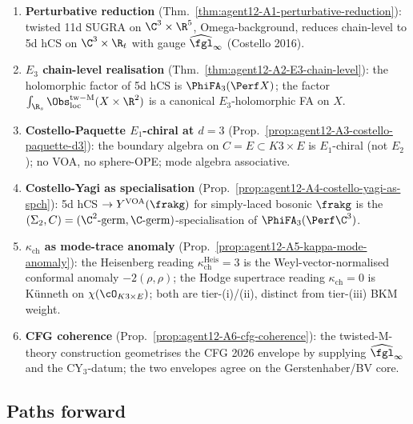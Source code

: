 \begin{enumerate}
\item \textbf{Perturbative reduction} (Thm.~\ref{thm:agent12-A1-perturbative-reduction}):
twisted 11d SUGRA on $\C^3 \times \R^5$, Omega-background, reduces
chain-level to 5d hCS on $\C^3 \times \R_t$ with gauge
$\widehat{\fgl}_\infty$ (Costello 2016).
\item \textbf{$E_3$ chain-level realisation} (Thm.~\ref{thm:agent12-A2-E3-chain-level}):
the holomorphic factor of 5d hCS is $\PhiFA_3(\Perf X)$; the factor
$\int_{\R_s} \Obs^{\mathrm{tw-M}}_{\mathrm{loc}}(X \times \R^2)$ is a
canonical $E_3$-holomorphic FA on $X$.
\item \textbf{Costello-Paquette $E_1$-chiral at $d = 3$}
(Prop.~\ref{prop:agent12-A3-costello-paquette-d3}): the boundary
algebra on $C = E \subset K3 \times E$ is $E_1$-chiral (not $E_2$);
no VOA, no sphere-OPE; mode algebra associative.
\item \textbf{Costello-Yagi as specialisation} (Prop.~\ref{prop:agent12-A4-costello-yagi-as-spch}):
5d hCS $\to Y^{\mathrm{VOA}}(\frakg)$ for simply-laced bosonic $\frakg$
is the $(\Sigma_2, C) = (\C^2\text{-germ}, \C\text{-germ})$-specialisation
of $\PhiFA_3(\Perf \C^3)$.
\item \textbf{$\kappa_{\mathrm{ch}}$ as mode-trace anomaly}
(Prop.~\ref{prop:agent12-A5-kappa-mode-anomaly}): the Heisenberg reading
$\kappa_{\mathrm{ch}}^{\mathrm{Heis}} = 3$ is the Weyl-vector-normalised
conformal anomaly $-2(\rho,\rho)$; the Hodge supertrace reading
$\kappa_{\mathrm{ch}} = 0$ is K\"unneth on $\chi(\cO_{K3 \times E})$;
both are tier-(i)/(ii), distinct from tier-(iii) BKM weight.
\item \textbf{CFG coherence} (Prop.~\ref{prop:agent12-A6-cfg-coherence}):
the twisted-M-theory construction geometrises the CFG 2026 envelope
by supplying $\widehat{\fgl}_\infty$ and the CY$_3$-datum; the two
envelopes agree on the Gerstenhaber/BV core.
\end{enumerate}

\subsection*{Paths forward}

